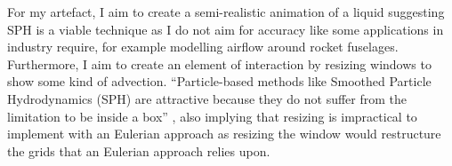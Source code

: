 \documentclass[write-up.tex]{subfiles}
\begin{document}
For my artefact, I aim to create a semi-realistic animation of a liquid suggesting SPH is a viable technique as I do not aim for accuracy like some applications in industry require, for example modelling airflow around rocket fuselages. Furthermore, I aim to create an element of interaction by resizing windows to show some kind of advection. ``Particle-based methods like Smoothed Particle Hydrodynamics (SPH) are attractive because they do not suffer from the limitation to be inside a box'' \cite{cohen}, also implying that resizing is impractical to implement with an Eulerian approach as resizing the window would restructure the grids that an Eulerian approach relies upon.
\vfill
\end{document}

